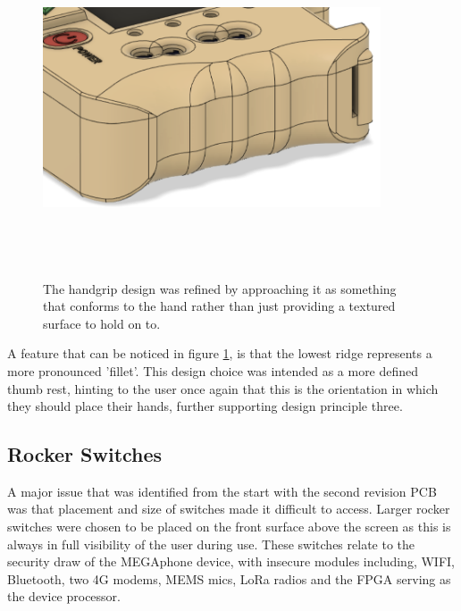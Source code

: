 \begin{figure} [h]
    \centering
    \includegraphics[width=10cm,height=10cm,keepaspectratio]{Figures/handgrip_final.png}
    \caption{The handgrip design was refined by approaching it as something that conforms to the hand rather than just providing a textured surface to hold on to.}
    \label{fig:new_grips}
\end{figure}

A feature that can be noticed in figure \ref{fig:new_grips}, is that the lowest ridge represents a more pronounced 'fillet'.
This design choice was intended as a more defined thumb rest, hinting to the user once again that this is the orientation in which they should place their hands, further supporting design principle three.

\subsection{Rocker Switches} \label{Rocker Switches}

A major issue that was identified from the start with the second revision PCB was that placement and size of switches made it difficult to access.
Larger rocker switches were chosen to be placed on the front surface above the screen as this is always in full visibility of the user during use.
These switches relate to the security draw of the MEGAphone device, with insecure modules including, WIFI, Bluetooth, two 4G modems, MEMS mics, LoRa radios and the FPGA serving as the device processor.

